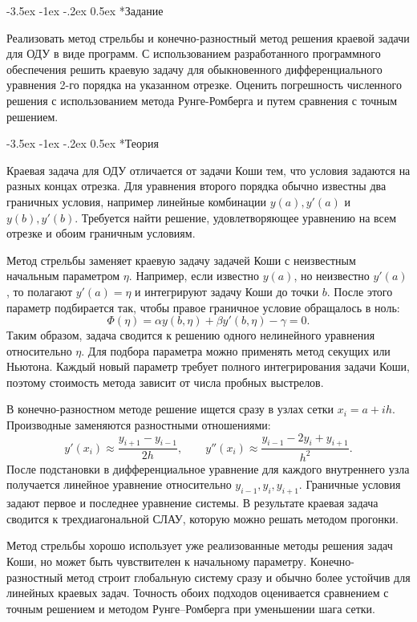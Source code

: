 \documentclass[14pt, a4paper]{article}
\makeatletter
\renewcommand\section{\@startsection {section}{1}{\parindent}%
  {-3.5ex \@plus -1ex \@minus -.2ex}%
  {0.5ex}%
  {\normalfont\Large\bfseries}}
\makeatother
\begin{document}
\section*{Задание}
Реализовать метод стрельбы и конечно-разностный метод решения краевой задачи для ОДУ в виде программ. С использованием разработанного программного обеспечения решить краевую задачу для обыкновенного дифференциального уравнения 2-го порядка на указанном отрезке. Оценить погрешность численного решения с использованием метода Рунге-Ромберга и путем сравнения с точным решением.

\section*{Теория}
Краевая задача для ОДУ отличается от задачи Коши тем, что условия задаются на разных концах отрезка. Для уравнения второго порядка обычно известны два граничных условия, например линейные комбинации $y(a),y'(a)$ и $y(b),y'(b)$. Требуется найти решение, удовлетворяющее уравнению на всем отрезке и обоим граничным условиям.

Метод стрельбы заменяет краевую задачу задачей Коши с неизвестным начальным параметром $\eta$. Например, если известно $y(a)$, но неизвестно $y'(a)$, то полагают $y'(a)=\eta$ и интегрируют задачу Коши до точки $b$. После этого параметр подбирается так, чтобы правое граничное условие обращалось в ноль:
\[
    \Phi(\eta)=\alpha y(b,\eta)+\beta y'(b,\eta)-\gamma=0.
\]
Таким образом, задача сводится к решению одного нелинейного уравнения относительно $\eta$. Для подбора параметра можно применять метод секущих или Ньютона. Каждый новый параметр требует полного интегрирования задачи Коши, поэтому стоимость метода зависит от числа пробных выстрелов.

В конечно-разностном методе решение ищется сразу в узлах сетки $x_i=a+ih$. Производные заменяются разностными отношениями:
\[
    y'(x_i)\approx\frac{y_{i+1}-y_{i-1}}{2h},\qquad
    y''(x_i)\approx\frac{y_{i-1}-2y_i+y_{i+1}}{h^2}.
\]
После подстановки в дифференциальное уравнение для каждого внутреннего узла получается линейное уравнение относительно $y_{i-1},y_i,y_{i+1}$. Граничные условия задают первое и последнее уравнение системы. В результате краевая задача сводится к трехдиагональной СЛАУ, которую можно решать методом прогонки.

Метод стрельбы хорошо использует уже реализованные методы решения задач Коши, но может быть чувствителен к начальному параметру. Конечно-разностный метод строит глобальную систему сразу и обычно более устойчив для линейных краевых задач. Точность обоих подходов оценивается сравнением с точным решением и методом Рунге--Ромберга при уменьшении шага сетки.
\end{document}
